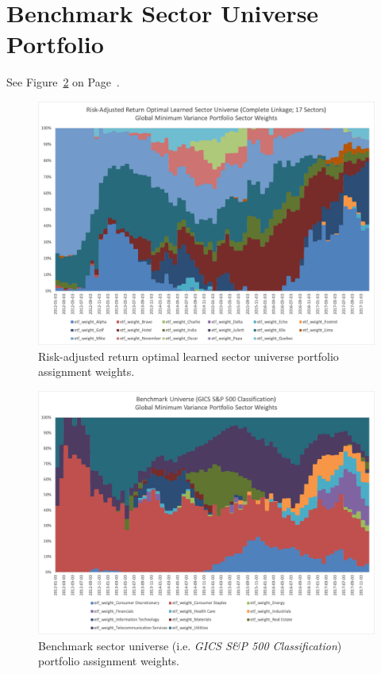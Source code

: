 \documentclass[../main.tex]{subfiles}
\begin{document}
\section*{Benchmark Sector Universe Portfolio}

See Figure~\ref{fig:appendix_weights:benchmark} on Page~\pageref{fig:appendix_weights:benchmark}.

\newpage
\begin{figure}
    \centering
    \includegraphics[width=\linewidth]{images/complete_17_sector_assignments.png}
    \caption{Risk-adjusted return optimal learned sector universe portfolio assignment weights.}
    \label{fig:appendix_weights:sharpe_optimal}
\end{figure}


\newpage
\begin{figure}
    \centering
    \includegraphics[width=\linewidth]{images/sp500_sector_assignments.png}
    \caption{Benchmark sector universe (i.e. \textit{GICS S\&P 500 Classification}) portfolio assignment weights.}
    \label{fig:appendix_weights:benchmark}
\end{figure}
\end{document}
